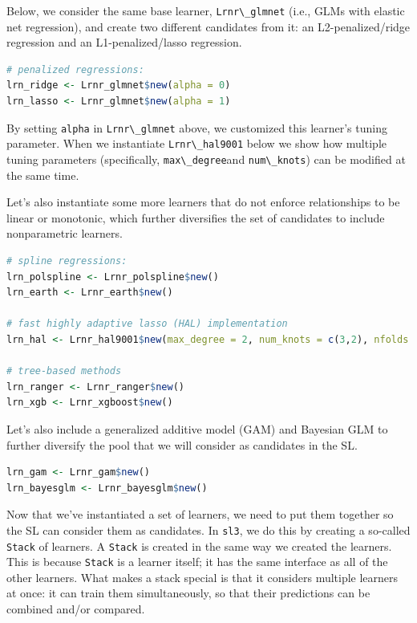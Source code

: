 \documentclass[
  12pt, krantz2,
]{krantz}
\newcommand{\passthrough}[1]{#1}
\newcommand{\1}{\mathbbm{1}}
\theoremstyle{definition}
\theoremstyle{definition}
\theoremstyle{definition}
\theoremstyle{definition}
\theoremstyle{remark}
\begin{document}
Below, we consider the same base learner, \passthrough{\lstinline!Lrnr\_glmnet!} (i.e., GLMs
with elastic net regression), and create two different candidates from it:
an L2-penalized/ridge regression and an L1-penalized/lasso regression.

\begin{lstlisting}[language=R]
# penalized regressions:
lrn_ridge <- Lrnr_glmnet$new(alpha = 0)
lrn_lasso <- Lrnr_glmnet$new(alpha = 1)
\end{lstlisting}

By setting \passthrough{\lstinline!alpha!} in \passthrough{\lstinline!Lrnr\_glmnet!} above, we customized this learner's tuning
parameter. When we instantiate \passthrough{\lstinline!Lrnr\_hal9001!} below we show how multiple tuning
parameters (specifically, \passthrough{\lstinline!max\_degree!}and \passthrough{\lstinline!num\_knots!}) can be modified at the
same time.

Let's also instantiate some more learners that do not enforce relationships to
be linear or monotonic, which further diversifies the set of candidates to
include nonparametric learners.

\begin{lstlisting}[language=R]
# spline regressions:
lrn_polspline <- Lrnr_polspline$new()
lrn_earth <- Lrnr_earth$new()

# fast highly adaptive lasso (HAL) implementation
lrn_hal <- Lrnr_hal9001$new(max_degree = 2, num_knots = c(3,2), nfolds = 5)

# tree-based methods
lrn_ranger <- Lrnr_ranger$new()
lrn_xgb <- Lrnr_xgboost$new()
\end{lstlisting}

Let's also include a generalized additive model (GAM) and Bayesian GLM to
further diversify the pool that we will consider as candidates in the SL.

\begin{lstlisting}[language=R]
lrn_gam <- Lrnr_gam$new()
lrn_bayesglm <- Lrnr_bayesglm$new()
\end{lstlisting}

Now that we've instantiated a set of learners, we need to put them together so
the SL can consider them as candidates. In \passthrough{\lstinline!sl3!}, we do this by creating a
so-called \passthrough{\lstinline!Stack!} of learners. A \passthrough{\lstinline!Stack!} is created in the same way we
created the learners. This is because \passthrough{\lstinline!Stack!} is a learner itself; it has the
same interface as all of the other learners. What makes a stack special is that
it considers multiple learners at once: it can train them simultaneously, so
that their predictions can be combined and/or compared.
\end{document}
